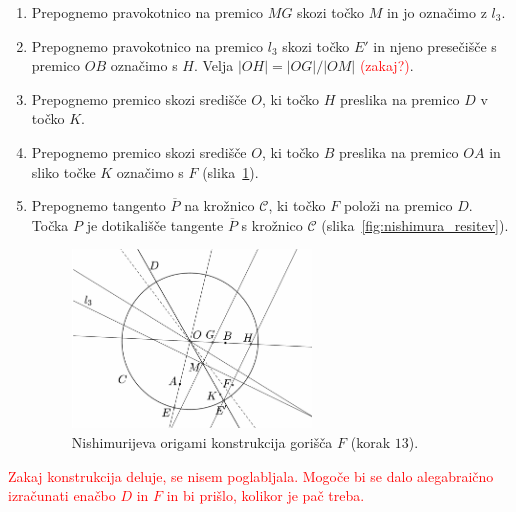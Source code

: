 \begin{enumerate}
    \item Prepognemo pravokotnico na premico $MG$ skozi točko $M$ in jo označimo z $l_3$.
    \item Prepognemo pravokotnico na premico $l_3$ skozi točko $E'$ in njeno presečišče s premico $OB$ označimo s $H$. Velja $|OH|= |OG|/|OM|$ \textcolor{red}{(zakaj?)}.
    \item Prepognemo premico skozi središče $O$, ki točko $H$ preslika na premico $D$ v točko $K$.
    \item Prepognemo premico skozi središče $O$, ki točko $B$ preslika na premico $OA$ in sliko točke $K$ označimo s $F$ (slika~\ref{fig:nishimura_origami2}).
    \item Prepognemo tangento $\overline{P}$ na krožnico $\mathcal{C}$, ki točko $F$ položi na premico $D$. Točka $P$ je dotikališče tangente $\overline{P}$ s krožnico $\mathcal{C}$ (slika~\ref{fig:nishimura_resitev}).
    \begin{figure}[h]
        \centering
        \includegraphics[width=0.6\textwidth]{images/alhazen/nishimura_origami2.png}
        \caption[Nishimurijeva konstrukcija $2$]{Nishimurijeva origami konstrukcija gorišča $F$ (korak $13$).}
        \label{fig:nishimura_origami2}
    \end{figure}
\end{enumerate}

\textcolor{red}{Zakaj konstrukcija deluje, se nisem poglabljala. Mogoče bi se dalo alegabraično izračunati enačbo $D$ in $F$ in bi prišlo, kolikor je pač treba.}